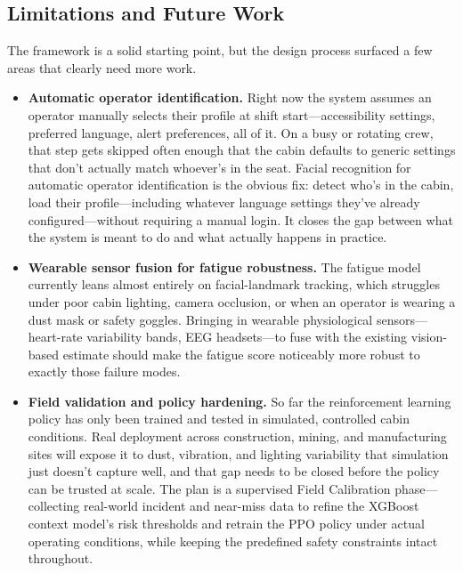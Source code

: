 \subsection{Limitations and Future Work}
The framework is a solid starting point, but the design process surfaced a few areas that clearly need more work.

\begin{itemize}
    \item \textbf{Automatic operator identification.} Right now the system assumes an operator manually selects their profile at shift start---accessibility settings, preferred language, alert preferences, all of it. On a busy or rotating crew, that step gets skipped often enough that the cabin defaults to generic settings that don't actually match whoever's in the seat. Facial recognition for automatic operator identification is the obvious fix: detect who's in the cabin, load their profile---including whatever language settings they've already configured---without requiring a manual login. It closes the gap between what the system is meant to do and what actually happens in practice.
    \item \textbf{Wearable sensor fusion for fatigue robustness.} The fatigue model currently leans almost entirely on facial-landmark tracking, which struggles under poor cabin lighting, camera occlusion, or when an operator is wearing a dust mask or safety goggles. Bringing in wearable physiological sensors---heart-rate variability bands, EEG headsets---to fuse with the existing vision-based estimate should make the fatigue score noticeably more robust to exactly those failure modes.
    \item \textbf{Field validation and policy hardening.} So far the reinforcement learning policy has only been trained and tested in simulated, controlled cabin conditions. Real deployment across construction, mining, and manufacturing sites will expose it to dust, vibration, and lighting variability that simulation just doesn't capture well, and that gap needs to be closed before the policy can be trusted at scale. The plan is a supervised Field Calibration phase---collecting real-world incident and near-miss data to refine the XGBoost context model's risk thresholds and retrain the PPO policy under actual operating conditions, while keeping the predefined safety constraints intact throughout.
\end{itemize}